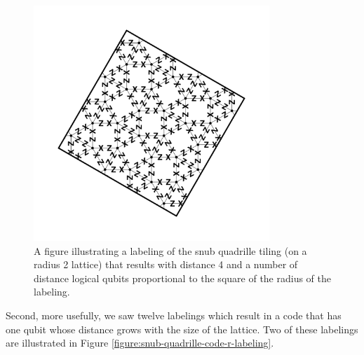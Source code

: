\documentclass{amsbook}
\theoremstyle{plain}
\theoremstyle{definition}
\theoremstyle{remark}
\begin{document}
\begin{figure}
\includegraphics[width=3.5in]{images/snub-quadrille-code-4-labeling} %
\caption{
\label{figure:snub-quadrille-code-4-labeling}
A figure illustrating a labeling of the snub quadrille tiling (on a radius 2 lattice) that results with distance 4 and a number of distance logical qubits proportional to the square of the radius of the labeling.
}
\end{figure}

Second, more usefully, we saw twelve labelings which result in a code that has one qubit whose distance grows with the size of the lattice.  Two of these labelings are illustrated in Figure \ref{figure:snub-quadrille-code-r-labeling}.
\end{document}
